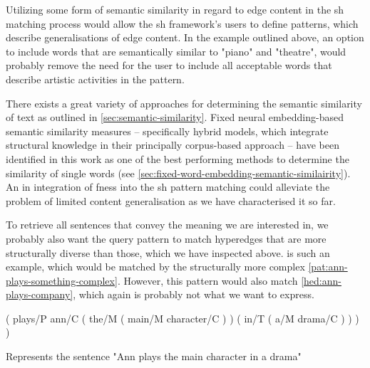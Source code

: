 \documentclass[11pt, numbers=noenddot]{scrreprt}
\let\cite\parencite  %
\begin{document}
Utilizing some form of semantic similarity in regard to edge content in the \gls{sh} matching process would allow the \gls{sh} framework's users to define patterns, which describe generalisations of edge content. In the example outlined above, an option to include words that are semantically similar to "piano" and "theatre", would probably remove the need for the user to include all acceptable words that describe artistic activities in the pattern. 

There exists a great variety of approaches for determining the semantic similarity of text as outlined in \cref{sec:semantic-similarity}. Fixed neural embedding-based semantic similarity measures -- specifically hybrid models, which integrate structural knowledge in their principally corpus-based approach -- have been identified in this work as one of the best performing methods to determine the similarity of single words (see \cref{sec:fixed-word-embedding-semantic-similairity}).
An in integration of \gls{fness} into the \gls{sh} pattern matching could alleviate the problem of limited content generalisation as we have characterised it so far.


To retrieve all sentences that convey the meaning we are interested in, we probably also want the query pattern to match hyperedges that are more structurally diverse than those, which we have inspected above.  is such an example, which would be matched by the structurally more complex \cref{pat:ann-plays-something-complex}. However, this pattern would also match \cref{hed:ann-plays-company}, which again is probably not what we want to express. 

\begin{hedge}[h!]
  \normalfont\sffamily
  \centering
 ( plays/P ann/C ( the/M ( main/M character/C ) ) ( in/T ( a/M drama/C ) ) ) )
  \caption{Represents the sentence "Ann plays the main character in a drama"}
  \label{hed:ann-plays-drama}
\end{hedge}
\end{document}
